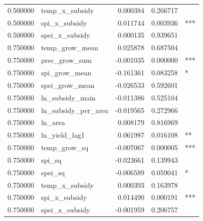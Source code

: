 \begin{table}
\begin{tabular}{rlrrl}
0.500000 & temp_x_subsidy & 0.000384 & 0.266717 &  \\
0.500000 & spi_x_subsidy & 0.011744 & 0.003936 & *** \\
0.500000 & spei_x_subsidy & 0.000135 & 0.939651 &  \\
0.750000 & temp_grow_mean & 0.025878 & 0.687504 &  \\
0.750000 & prec_grow_sum & -0.001035 & 0.000000 & *** \\
0.750000 & spi_grow_mean & -0.161361 & 0.083258 & * \\
0.750000 & spei_grow_mean & -0.026533 & 0.592601 &  \\
0.750000 & ln_subsidy_main & -0.011386 & 0.525104 &  \\
0.750000 & ln_subsidy_per_area & -0.019565 & 0.272966 &  \\
0.750000 & ln_area & 0.008179 & 0.816969 &  \\
0.750000 & ln_yield_lag1 & 0.061987 & 0.016108 & ** \\
0.750000 & temp_grow_sq & -0.007067 & 0.000005 & *** \\
0.750000 & spi_sq & -0.023661 & 0.139943 &  \\
0.750000 & spei_sq & -0.006589 & 0.059041 & * \\
0.750000 & temp_x_subsidy & 0.000393 & 0.163978 &  \\
0.750000 & spi_x_subsidy & 0.014490 & 0.000191 & *** \\
0.750000 & spei_x_subsidy & -0.001959 & 0.206757 &  \\
\bottomrule
\end{tabular}
\end{table}
